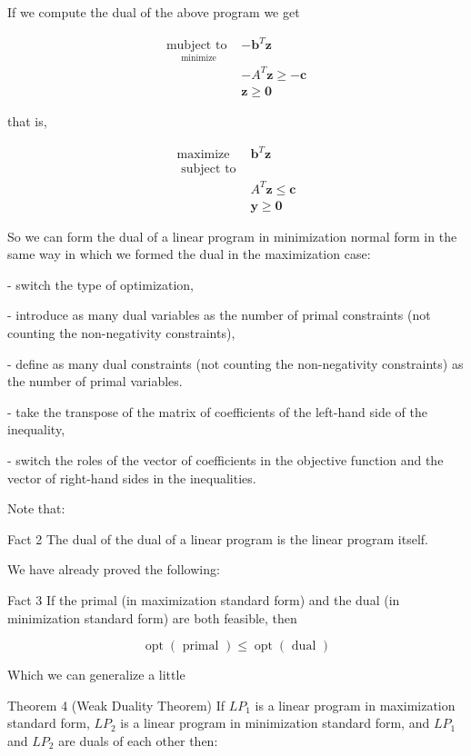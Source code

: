 \documentclass[letter,12pt]{book}
\renewcommand{\0}{\mathbf{0}}
\begin{document}
If we compute the dual of the above program we get

$$
\begin{array}{ll}
\underset{\text { minimize }}{\operatorname{mubject} \text { to }} & -\mathbf{b}^{T} \mathbf{z} \\
& -A^{T} \mathbf{z} \geq-\mathbf{c} \\
& \mathbf{z} \geq \mathbf{0}
\end{array}
$$

that is,

$$
\begin{array}{ll}
\operatorname{maximize} & \mathbf{b}^{T} \mathbf{z} \\
\text { subject to } & \\
& A^{T} \mathbf{z} \leq \mathbf{c} \\
& \mathbf{y} \geq \mathbf{0}
\end{array}
$$

So we can form the dual of a linear program in minimization normal form in the same way in which we formed the dual in the maximization case:

- switch the type of optimization,

- introduce as many dual variables as the number of primal constraints (not counting the non-negativity constraints),

- define as many dual constraints (not counting the non-negativity constraints) as the number of primal variables.

- take the transpose of the matrix of coefficients of the left-hand side of the inequality,

- switch the roles of the vector of coefficients in the objective function and the vector of right-hand sides in the inequalities.

Note that:

Fact 2 The dual of the dual of a linear program is the linear program itself.

We have already proved the following:

Fact 3 If the primal (in maximization standard form) and the dual (in minimization standard form) are both feasible, then

$$
\operatorname{opt}(\text { primal }) \leq \operatorname{opt}(\text { dual })
$$

Which we can generalize a little

Theorem 4 (Weak Duality Theorem) If $L P_{1}$ is a linear program in maximization standard form, $L P_{2}$ is a linear program in minimization standard form, and $L P_{1}$ and $L P_{2}$ are duals of each other then:
\end{document}
